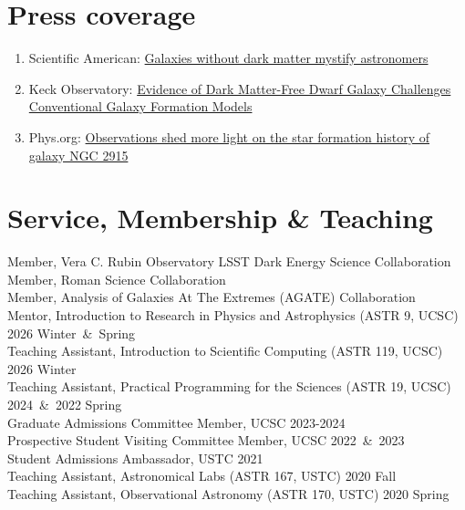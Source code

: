 \documentclass[letterpaper,11pt]{article}
\begin{document}
\section{Press coverage}
\begin{enumerate}[itemsep=0pt]
  \item[-] Scientific American: \href{https://www.scientificamerican.com/article/galaxies-without-dark-matter-mystify-astronomers/}{Galaxies without dark matter mystify astronomers}
  \item[-] Keck Observatory: \href{https://keckobservatory.org/dmf-dwarf-galaxy/}{Evidence of Dark Matter-Free Dwarf Galaxy Challenges Conventional Galaxy Formation Models}
  \item[-] Phys.org: \href{https://phys.org/news/2022-10-star-formation-history-galaxy-ngc.html}{Observations shed more light on the star formation history of galaxy NGC 2915}
\end{enumerate}

\section{Service, Membership \& Teaching}
Member, Vera C. Rubin Observatory LSST Dark Energy Science Collaboration\\
Member, Roman Science Collaboration\\
Member, Analysis of Galaxies At The Extremes (AGATE) Collaboration\\
Mentor, Introduction to Research in Physics and Astrophysics (ASTR 9, UCSC) \hfill {2026 Winter~\&~Spring}\\
Teaching Assistant, Introduction to Scientific Computing (ASTR 119, UCSC) \hfill {2026 Winter}\\
Teaching Assistant, Practical Programming for the Sciences (ASTR 19, UCSC) \hfill {2024~\&~2022 Spring}\\
Graduate Admissions Committee Member, UCSC \hfill {2023-2024}\\
Prospective Student Visiting Committee Member, UCSC \hfill {2022~\&~2023}\\
Student Admissions Ambassador, USTC \hfill {2021}\\
Teaching Assistant, Astronomical Labs (ASTR 167, USTC) \hfill {2020 Fall}\\
Teaching Assistant, Observational Astronomy (ASTR 170, USTC) \hfill {2020 Spring}
\end{document}
